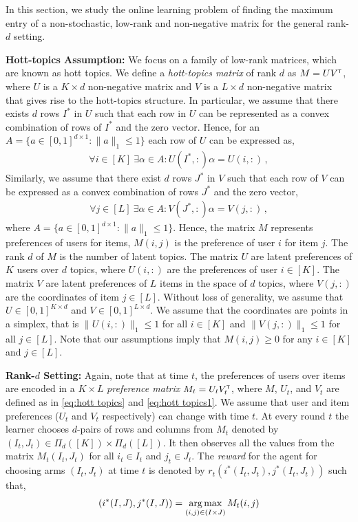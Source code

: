 
In this section, we study the online learning problem of finding the maximum entry of a non-stochastic, low-rank and non-negative matrix for the general rank-$d$ setting. 

\textbf{Hott-topics Assumption:} We focus on a family of low-rank matrices, which are known as hott topics. We define a \emph{hott-topics matrix} of rank $d$ as $M = U V^\mathsf{\scriptscriptstyle T}$, where $U$ is a $K \times d$ non-negative matrix and $V$ is a $L \times d$ non-negative matrix that gives rise to the hott-topics structure. In particular, we assume that there exists $d$ rows $I^\ast$ in $U$ such that each row in $U$ can be represented as a convex combination of rows of $I^\ast$ and the zero vector. Hence, for an $A = \{a \in [0, 1]^{d \times 1}: \|a\|_1 \leq 1\}$ each row of $U$ can be expressed as,
\begin{align}
  \forall i \in [K] \ \exists \alpha \in A: U(I^\ast, :) \alpha = U(i, :)\,,
  \label{eq:hott topics1}
\end{align}
Similarly, we assume that there exist $d$ rows $J^\ast$ in $V$ such that each row of $V$ can be expressed as a convex combination of rows $J^\ast$ and the zero vector,
\begin{align}
  \forall j \in [L] \ \exists \alpha \in A: V(J^\ast, :) \alpha = V(j, :)\,,
  \label{eq:hott topics}
\end{align}
where $A = \{a \in [0, 1]^{d \times 1}: \|a\|_1 \leq 1\}$. Hence, the matrix $M$ represents preferences of users for items, $M(i, j)$ is the preference of user $i$ for item $j$. The rank $d$ of $M$ is the number of latent topics. The matrix $U$ are latent preferences of $K$ users over $d$ topics, where $U(i, :)$ are the preferences of user $i \in [K]$. The matrix $V$ are latent preferences of $L$ items in the space of $d$ topics, where $V(j, :)$ are the coordinates of item $j \in [L]$. Without loss of generality, we assume that $U \in [0, 1]^{K \times d}$ and $V \in [0, 1]^{L \times d}$. We assume that the coordinates are points in a simplex, that is $\|U(i, :)\|_1 \leq 1$ for all $i \in [K]$ and $\|V(j, :)\|_1 \leq 1$ for all $j \in [L]$. Note that our assumptions imply that $M(i, j) \geq 0$ for any $i \in [K]$ and $j \in [L]$.


\textbf{Rank-$d$ Setting:} Again, note that at time $t$, the preferences of users over items are encoded in a $K \times L$ \emph{preference matrix} $M_t = U_t V_t^\mathsf{\scriptscriptstyle T}$, where $M$, $U_t$, and $V_t$ are defined as in \eqref{eq:hott topics} and \eqref{eq:hott topics1}. We assume that user and item preferences ($U_t$ and $V_t$ respectively) can change with time $t$. 
At every round $t$ the learner chooses $d$-pairs of rows and columns from $M_t$ denoted by $(I_t,J_t)\in \Pi_d([K])\times \Pi_d([L])$. It then observes all the values from the matrix $M_{t}(I_t,J_t)$ for all $i_t\in I_t$ and $j_t \in J_t$. The \emph{reward} for the agent for choosing arms $(I_t,J_t)$ at time $t$ is denoted by $r_t(i^\ast(I_t,J_t),j^\ast(I_t,J_t))$ such that,
\begin{align}
  (i^\ast(I,J),j^\ast(I,J)) = \mathop{\rm arg\,max}_{(i,j) \in (I\times J)} M_{t}(i,j)
  \label{eq:reward}
\end{align}

